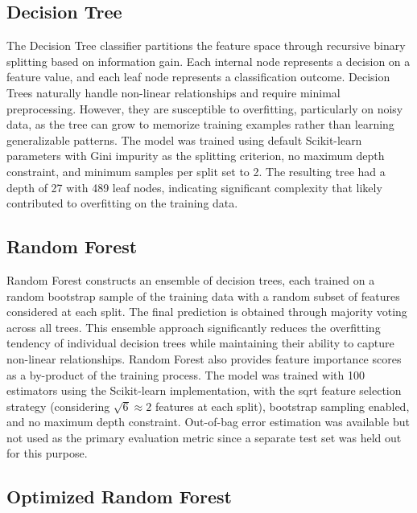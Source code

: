\documentclass[12pt,letterpaper]{report}
\begin{document}
\subsection{Decision Tree}

The Decision Tree classifier partitions the feature space through recursive binary splitting based on information gain. Each internal node represents a decision on a feature value, and each leaf node represents a classification outcome. Decision Trees naturally handle non-linear relationships and require minimal preprocessing. However, they are susceptible to overfitting, particularly on noisy data, as the tree can grow to memorize training examples rather than learning generalizable patterns. The model was trained using default Scikit-learn parameters with Gini impurity as the splitting criterion, no maximum depth constraint, and minimum samples per split set to 2. The resulting tree had a depth of 27 with 489 leaf nodes, indicating significant complexity that likely contributed to overfitting on the training data.

\subsection{Random Forest}

Random Forest constructs an ensemble of decision trees, each trained on a random bootstrap sample of the training data with a random subset of features considered at each split. The final prediction is obtained through majority voting across all trees. This ensemble approach significantly reduces the overfitting tendency of individual decision trees while maintaining their ability to capture non-linear relationships. Random Forest also provides feature importance scores as a by-product of the training process. The model was trained with 100 estimators using the Scikit-learn implementation, with the sqrt feature selection strategy (considering $\sqrt{6} \approx 2$ features at each split), bootstrap sampling enabled, and no maximum depth constraint. Out-of-bag error estimation was available but not used as the primary evaluation metric since a separate test set was held out for this purpose.

\subsection{Optimized Random Forest}
\end{document}
